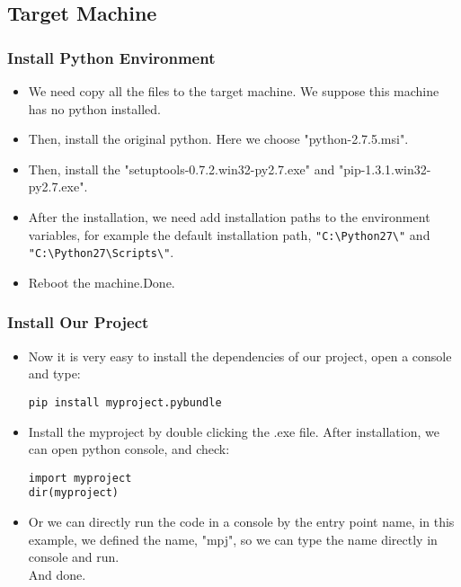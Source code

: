 \documentclass{article}
\begin{document}
\newpage
\subsection{Target Machine}
\subsubsection{Install Python Environment}
\begin{itemize}
\item
We need copy all the files to the target machine. We suppose this machine has no python installed.
\item
Then, install the original python. Here we choose "python-2.7.5.msi".
\item
Then, install the "setuptools-0.7.2.win32-py2.7.exe" and "pip-1.3.1.win32-py2.7.exe".
\item
After the installation, we need add installation paths to the environment variables, 
for example the default installation path, \verb/"C:\Python27\"/ and \verb/"C:\Python27\Scripts\"/.
\item
Reboot the machine.Done.
\end{itemize}
\subsubsection{Install Our Project}
\begin{itemize}
\item
Now it is very easy to install the dependencies of our project, open a console and type:
\begin{lstlisting}
pip install myproject.pybundle
\end{lstlisting}
\item
Install the myproject by double clicking the .exe file.
After installation, we can open python console, and check:
\begin{lstlisting}
import myproject
dir(myproject)
\end{lstlisting}
\item
Or we can directly run the code in a console by the entry point name,
in this example, we defined the name, "mpj", so we can type the name directly in console and run. \\
And done.
\end{itemize}


\end{document}
